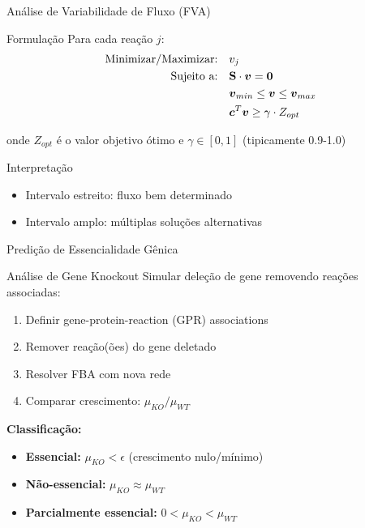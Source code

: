 \begin{frame}{Análise de Variabilidade de Fluxo (FVA)}

\vspace{0.3cm}

\begin{block}{Formulação}
Para cada reação $j$:
\begin{align*}
\text{Minimizar/Maximizar:} \quad & v_j\\
\text{Sujeito a:} \quad & \mathbf{S} \cdot \boldsymbol{v} = \boldsymbol{0}\\
& \boldsymbol{v}_{min} \leq \boldsymbol{v} \leq \boldsymbol{v}_{max}\\
& \boldsymbol{c}^T \boldsymbol{v} \geq \gamma \cdot Z_{opt}
\end{align*}

onde $Z_{opt}$ é o valor objetivo ótimo e $\gamma \in [0,1]$ (tipicamente 0.9-1.0)
\end{block}

\begin{exampleblock}{Interpretação}
\begin{itemize}
    \item Intervalo estreito: fluxo bem determinado
    \item Intervalo amplo: múltiplas soluções alternativas
\end{itemize}
\end{exampleblock}
\end{frame}

\begin{frame}{Predição de Essencialidade Gênica}
\begin{block}{Análise de Gene Knockout}
Simular deleção de gene removendo reações associadas:
\begin{enumerate}
    \item Definir gene-protein-reaction (GPR) associations
    \item Remover reação(ões) do gene deletado
    \item Resolver FBA com nova rede
    \item Comparar crescimento: $\mu_{KO} / \mu_{WT}$
\end{enumerate}
\end{block}

\textbf{Classificação:}
\begin{itemize}
    \item \textbf{Essencial:} $\mu_{KO} < \epsilon$ (crescimento nulo/mínimo)
    \item \textbf{Não-essencial:} $\mu_{KO} \approx \mu_{WT}$
    \item \textbf{Parcialmente essencial:} $0 < \mu_{KO} < \mu_{WT}$
\end{itemize}

\vspace{0.3cm}

\end{frame}

